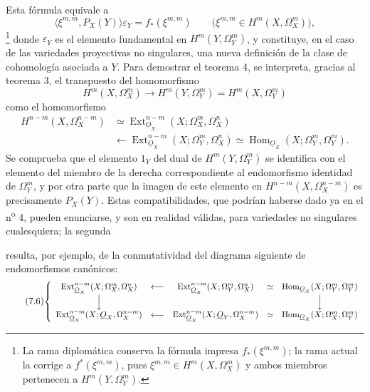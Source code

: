 \documentclass[11pt,twoside,openany]{book}
\numberwithin{equation}{section}
\newcommand{\src}[1]{%
  \phantomsection\hypertarget{src:#1}{}%
  \marginpar{\raggedleft\footnotesize\sffamily #1}%
}
\newcommand{\Osh}{\underline{O}}
\theoremstyle{plain}
\theoremstyle{definition}
\theoremstyle{remark}
\newcommand{\FgaUnitKey}{frontmatter}
\renewcommand{\src}[1]{%
  \phantomsection\hypertarget{src:\FgaUnitKey:#1}{}%
  \marginpar{\raggedleft\footnotesize\sffamily #1}%
}
\theoremstyle{plain}
\theoremstyle{definition}
\theoremstyle{remark}
\begin{document}
Esta fórmula equivale a
\begin{equation}\tag{7.4 bis}
  \bigl\langle\xi^{m,m},P_X(Y)\bigr\rangle\varepsilon_Y
  =f_{*}(\xi^{m,m})
  \qquad
  \bigl(\xi^{m,m}\in H^{m}(X,\Omega_X^{m})\bigr),
\end{equation}
\footnote{La rama diplomática conserva la fórmula impresa
$f_{*}(\xi^{m,m})$; la rama actual la corrige a $f^{*}(\xi^{m,m})$, pues
$\xi^{m,m}\in H^{m}(X,\Omega_X^{m})$ y ambos miembros pertenecen a
$H^{m}(Y,\Omega_Y^{m})$.} donde
$\varepsilon_Y$ es el elemento fundamental en $H^{m}(Y,\Omega_Y^{m})$, y
constituye, en el caso de las variedades proyectivas no singulares, una nueva
definición de la clase de cohomología asociada a $Y$. Para demostrar el
teorema 4, se interpreta, gracias al teorema 3, el transpuesto del homomorfismo
\[
  H^{m}(X,\Omega_X^{m})
  \longrightarrow H^{m}(Y,\Omega_Y^{m})
  =H^{m}(X,\Omega_Y^{m})
\]
como el homomorfismo
\begin{equation}\tag{7.5}
\begin{split}
  H^{n-m}(X,\Omega_X^{n-m})
  &\simeq
  \operatorname{Ext}_{\Osh_X}^{n-m}(X;\Omega_X^{m},\Omega_X^{n})\\
  &\longleftarrow
  \operatorname{Ext}_{\Osh_X}^{n-m}(X;\Omega_Y^{m},\Omega_X^{n})
  \simeq
  \operatorname{Hom}_{\Osh_X}(X;\Omega_Y^{m},\Omega_Y^{m}).
\end{split}
\end{equation}
Se comprueba que el elemento $1_Y$ del dual de $H^{m}(Y,\Omega_Y^{m})$ se identifica
con el elemento del miembro de la derecha correspondiente al endomorfismo identidad de
$\Omega_Y^{m}$, y por otra parte que la imagen de este elemento en
$H^{n-m}(X,\Omega_X^{n-m})$ es precisamente $P_X(Y)$. Estas compatibilidades, que podrían
haberse dado ya en el n\textsuperscript{o} 4, pueden enunciarse, y son
en realidad válidas, para variedades no singulares cualesquiera; la segunda

\src{189}
resulta, por ejemplo, de la conmutatividad del diagrama siguiente de endomorfismos
canónicos:
\begin{equation}\tag{7.6}
\resizebox{\textwidth}{!}{$
\left\{
\begin{array}{ccccc}
\operatorname{Ext}_{\Osh_X}^{n-m}(X;\Omega_X^{m},\Omega_X^{n})
&\longleftarrow&
\operatorname{Ext}_{\Osh_X}^{n-m}(X;\Omega_Y^{m},\Omega_X^{n})
&\simeq&
\operatorname{Hom}_{\Osh_X}(X;\Omega_Y^{m},\Omega_Y^{m})\\[3pt]
\Big\downarrow&&&&\Big\downarrow\\[3pt]
\operatorname{Ext}_{\Osh_X}^{n-m}(X;\Osh_X,\Omega_X^{n-m})
&\longleftarrow&
\operatorname{Ext}_{\Osh_X}^{n-m}(X;\Osh_Y,\Omega_X^{n-m})
&\simeq&
\operatorname{Hom}_{\Osh_X}(X;\Omega_X^{m},\Omega_Y^{m})
\end{array}
\right.
$}
\end{equation}
\end{document}
